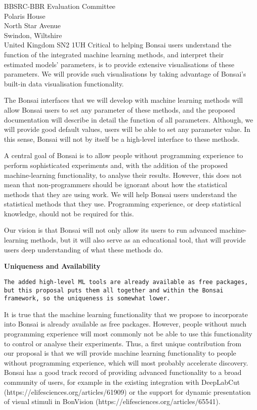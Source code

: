 \documentclass[12pt]{letter}
\begin{document}
\begin{letter}{
    BBSRC-BBR Evaluation Committee\\
    Polaris House\\
    North Star Avenue\\
    Swindon, Wiltshire\\
    United Kingdom SN2 1UH
}
Critical to helping Bonsai users understand the function of the integrated machine
learning methods, and interpret their estimated models' parameters, is to
provide extensive visualisations of these parameters. We will provide such
visualisations by taking advantage of Bonsai's built-in data visualisation functionality.

The Bonsai interfaces that we will develop with machine learning methods will
allow Bonsai users to set any parameter of these methods, and the proposed
documentation will describe in detail the function of all parameters. Although,
we will provide good default values, users will be able to set any parameter
value. In this sense, Bonsai will not by itself be a high-level interface to these
methods.

A central goal of Bonsai is to allow people without programming experience to
perform sophisticated experiments and, with the addition of the proposed
machine-learning functionality, to analyse their results. However, this does
not mean that non-programmers should be ignorant about how the statistical
methods that they are using work. We will help Bonsai users understand the
statistical methods that they use. Programming experience, or deep statistical
knowledge, should not be required for this.

Our vision is that Bonsai will not only allow its users to run advanced
machine-learning methods, but it will also serve as an educational tool, that
will provide users deep understanding of what these methods do.

\noindent\textbf{Uniqueness and Availability}

\texttt{The added high-level ML tools are already available as free packages,
but this proposal puts them all together and within the Bonsai framework, so
the uniqueness is somewhat lower.}

It is true that the machine learning functionality that we propose to
incorporate into Bonsai is already available as free packages. However, people
without much programming experience will most commonly not be able to use this
functionality to control or analyse their experiments. Thus, a first unique
contribution from our proposal is that we will provide machine learning
functionality to people without programming experience, which will most
probably accelerate discovery. Bonsai has a good track record of providing advanced functionality to a broad community of users, for example in the existing integration with DeepLabCut (https://elifesciences.org/articles/61909) or the support for dynamic presentation of visual stimuli in BonVision (https://elifesciences.org/articles/65541). 


\end{letter}
\end{document}
